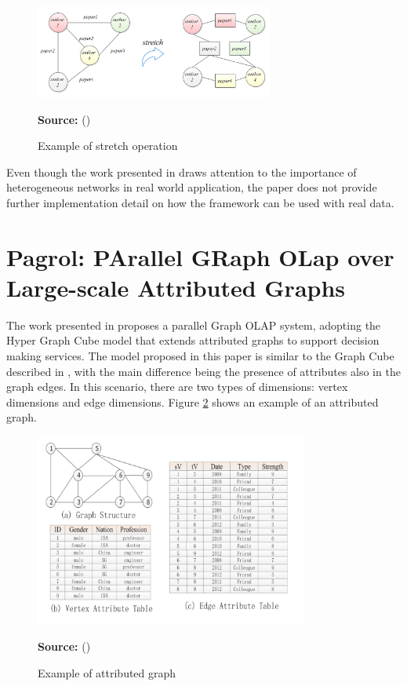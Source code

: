 \begin{figure}[ht]
\centering
\caption{Example of stretch operation}
\label{fig:figure19}
\includegraphics[width=0.7\textwidth]{images/stretch_operation_example.png}
\par\medskip\ABNTEXfontereduzida\selectfont\textbf{Source:} \citeauthor{Yin2012} (\citeyear{Yin2012}) \par\medskip
\end{figure}

Even though the work presented in \cite{Yin2012} draws attention to the importance of heterogeneous networks in real world application, the paper does not provide further implementation detail on how the framework can be used with real data.

\section{Pagrol: PArallel GRaph OLap over Large-scale Attributed Graphs}

The work presented in \cite{Wang2014} proposes a parallel Graph OLAP system, adopting the Hyper Graph Cube model that extends attributed graphs to support decision making services. The model proposed in this paper is similar to the Graph Cube described in \cite{Zhao2011}, with the main difference being the presence of attributes also in the graph edges. In this scenario, there are two types of dimensions: vertex dimensions and edge dimensions. Figure \ref{fig:figure20} shows an example of an attributed graph.

\begin{figure}[ht]
\centering
\caption{Example of attributed graph}
\label{fig:figure20}
\includegraphics[width=0.8\textwidth]{images/attributed_graph.png}
\par\medskip\ABNTEXfontereduzida\selectfont\textbf{Source:} \citeauthor{Wang2014} (\citeyear{Wang2014}) \par\medskip
\end{figure}

